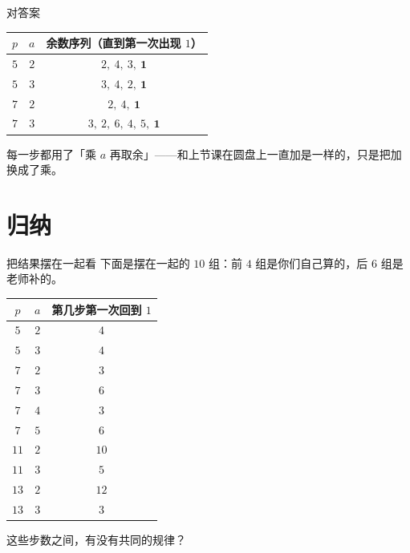 \documentclass[10pt]{beamer}
\begin{document}
\begin{frame}{对答案}
  \begin{center}
  \begin{tabular}{@{}ccc@{}}
    \toprule
    \(p\) & \(a\) & 余数序列（直到第一次出现 \(1\)） \\
    \midrule
    \(5\) & \(2\) & \(2,\ 4,\ 3,\ \mathbf{1}\) \\
    \(5\) & \(3\) & \(3,\ 4,\ 2,\ \mathbf{1}\) \\
    \(7\) & \(2\) & \(2,\ 4,\ \mathbf{1}\) \\
    \(7\) & \(3\) & \(3,\ 2,\ 6,\ 4,\ 5,\ \mathbf{1}\) \\
    \bottomrule
  \end{tabular}
  \end{center}
  \pause
  \begin{center}
    每一步都用了「乘 \(a\) 再取余」——和上节课在圆盘上一直加是一样的，只是把加换成了乘。
  \end{center}
\end{frame}

\section{归纳}

\begin{frame}{把结果摆在一起看}
  下面是摆在一起的 \(10\) 组：前 \(4\) 组是你们自己算的，后 \(6\) 组是老师补的。
  \begin{center}
  \begin{tabular}{@{}ccc@{}}
    \toprule
    \(p\) & \(a\) & 第几步第一次回到 \(1\) \\
    \midrule
    \(5\) & \(2\) & \(4\) \\
    \(5\) & \(3\) & \(4\) \\
    \(7\) & \(2\) & \(3\) \\
    \(7\) & \(3\) & \(6\) \\
    \(7\) & \(4\) & \(3\) \\
    \(7\) & \(5\) & \(6\) \\
    \(11\) & \(2\) & \(10\) \\
    \(11\) & \(3\) & \(5\) \\
    \(13\) & \(2\) & \(12\) \\
    \(13\) & \(3\) & \(3\) \\
    \bottomrule
  \end{tabular}
  \end{center}
  \pause
  \begin{center}
    {\large 这些步数之间，有没有共同的规律？}
  \end{center}
\end{frame}
\end{document}
